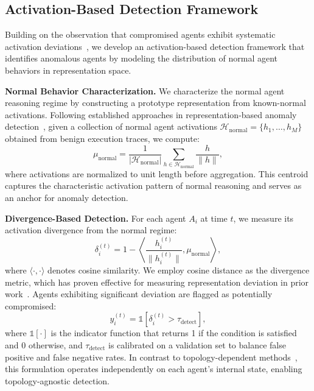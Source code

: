 \documentclass{article}
\theoremstyle{plain}
\theoremstyle{definition}
\theoremstyle{remark}
\begin{document}
\subsection{Activation-Based Detection Framework}
Building on the observation that compromised agents exhibit systematic
activation deviations~\cite{zhang2025jbshield,zhang2025controlling,tan2024revprag,jin2025internal}, 
we develop an activation-based detection framework that identifies anomalous 
agents by modeling the distribution of normal agent behaviors in 
representation space.

\noindent\textbf{Normal Behavior Characterization.}
We characterize the normal agent reasoning regime by constructing a prototype 
representation from known-normal activations.
Following established approaches in representation-based anomaly 
detection~\cite{tan2024revprag}, given a collection of normal agent 
activations $\mathcal{H}_{\text{normal}} = \{h_1, \ldots, h_M\}$ obtained 
from benign execution traces, we compute:
\begin{equation}
\mu_{\text{normal}} = \frac{1}{|\mathcal{H}_{\text{normal}}|}
\sum_{h \in \mathcal{H}_{\text{normal}}} \frac{h}{\|h\|},
\label{eq:prototype}
\end{equation}
where activations are normalized to unit length before aggregation.
This centroid captures the characteristic activation pattern of normal
reasoning and serves as an anchor for anomaly detection.

\noindent\textbf{Divergence-Based Detection.}
For each agent $A_i$ at time $t$, we measure its activation divergence from the
normal regime:
\begin{equation}
\delta_i^{(t)} = 1 -
\left\langle \frac{h_i^{(t)}}{\|h_i^{(t)}\|}, \mu_{\text{normal}} \right\rangle,
\label{eq:divergence}
\end{equation}
where $\langle \cdot, \cdot \rangle$ denotes cosine similarity.
We employ cosine distance as the divergence metric, which has proven effective 
for measuring representation deviation in prior 
work~\cite{reimers2019sentence}.
Agents exhibiting significant deviation are flagged as potentially compromised:
\begin{equation}
y_i^{(t)} = \mathbb{1}\!\left[\delta_i^{(t)} > \tau_{\text{detect}}\right],
\label{eq:detection}
\end{equation}
where $\mathbb{1}[\cdot]$ is the indicator function that returns 1 if the 
condition is satisfied and 0 otherwise, and $\tau_{\text{detect}}$ is calibrated on a validation set to balance false
positive and false negative rates.
In contrast to topology-dependent methods~\cite{wang2025g,miao2025blindguard},
this formulation operates independently on each agent's internal state,
enabling topology-agnostic detection.
\end{document}
